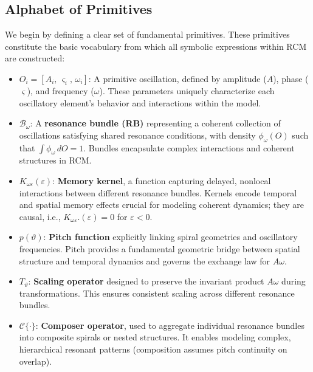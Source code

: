 \subsection{Alphabet of Primitives}

We begin by defining a clear set of fundamental primitives. These primitives constitute the basic vocabulary from which all symbolic expressions within RCM are constructed:

\begin{itemize}
    \item $O_i = [A_i,\,\varsigma_i,\,\omega_i]$: A primitive oscillation, defined by amplitude ($A$), phase ($\varsigma$), and frequency ($\omega$). These parameters uniquely characterize each oscillatory element's behavior and interactions within the model.

    \item $\mathcal{B}_\omega$: A \textbf{resonance bundle (RB)} representing a coherent collection of oscillations satisfying shared resonance conditions, with density $\phi_\omega(O)$ such that $\int \phi_\omega\, dO = 1$. Bundles encapsulate complex interactions and coherent structures in RCM.

    \item $K_{\omega\varepsilon}(\varepsilon)$: \textbf{Memory kernel}, a function capturing delayed, nonlocal interactions between different resonance bundles. Kernels encode temporal and spatial memory effects crucial for modeling coherent dynamics; they are causal, i.e., $K_{\omega\varepsilon}.  (\varepsilon)=0$ for $\varepsilon<0$.

    \item $p(\vartheta)$: \textbf{Pitch function} explicitly linking spiral geometries and oscillatory frequencies. Pitch provides a fundamental geometric bridge between spatial structure and temporal dynamics and governs the exchange law for $A\omega$.

    \item $T_{\vartheta}$: \textbf{Scaling operator} designed to preserve the invariant product $A\omega$ during transformations. This ensures consistent scaling across different resonance bundles.

    \item $\mathcal{C}\{\cdot\}$: \textbf{Composer operator}, used to aggregate individual resonance bundles into composite spirals or nested structures. It enables modeling complex, hierarchical resonant patterns (composition assumes pitch continuity on overlap).


\end{itemize}
